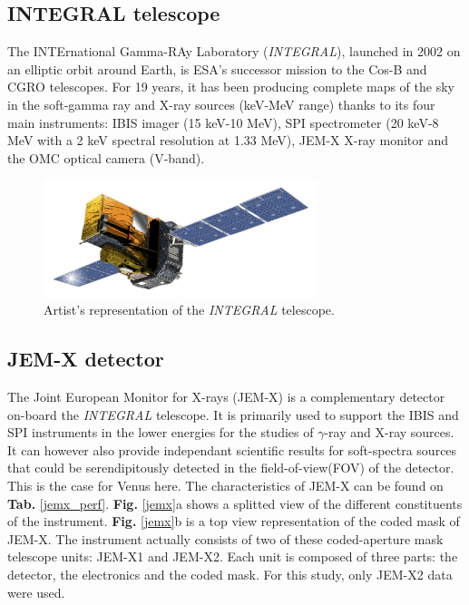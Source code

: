\subsection{INTEGRAL telescope}
The INTErnational Gamma-RAy Laboratory (\textit{INTEGRAL}), launched in 2002 on an elliptic orbit around Earth, is ESA's successor mission to the Cos-B and CGRO telescopes. For 19 years, it has been producing complete maps of the sky in the soft-gamma ray and X-ray sources (keV-MeV range) thanks to its four main instruments: IBIS imager (15 keV-10 MeV), SPI spectrometer (20 keV-8 MeV with a 2 keV spectral resolution at 1.33 MeV), JEM-X X-ray monitor and the OMC optical camera (V-band).
    
    \begin{figure}[H]
        \centering
        \includegraphics[width = 8cm]{report/Figures/intro/INTEGRAL_spacecraft_model.png}
        \caption{Artist's representation of the \textit{INTEGRAL} telescope.}
        \label{integral}
    \end{figure}
    
        \subsection{JEM-X detector}
        The Joint European Monitor for X-rays (JEM-X) is a complementary detector on-board the \textit{INTEGRAL} telescope. It is primarily used to support the IBIS and SPI instruments in the lower energies for the studies of $\gamma$-ray and X-ray sources. It can however also provide independant scientific results for soft-spectra sources that could be serendipitously detected in the field-of-view(FOV) of the detector. This is the case for Venus here.
        The characteristics of JEM-X can be found on \textbf{Tab.} \ref{jemx_perf}. \textbf{Fig.} \ref{jemx}a shows a splitted view of the different constituents of the instrument. \textbf{Fig.} \ref{jemx}b is a top view representation of the coded mask of JEM-X. The instrument actually consists of two of these coded-aperture mask telescope units: JEM-X1 and JEM-X2. Each unit is composed of three parts: the detector, the electronics and the coded mask. For this study, only JEM-X2 data were used.

